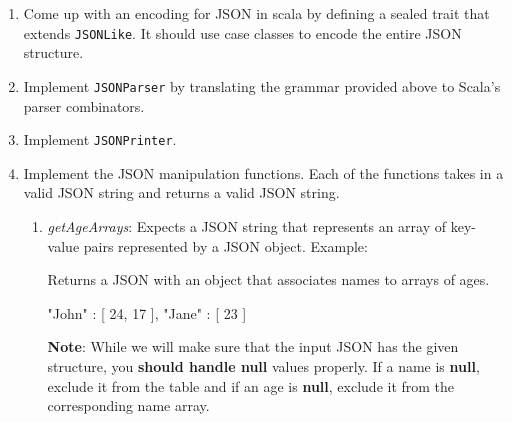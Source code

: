 \begin{enumerate}
    \item Come up with an encoding for JSON in scala by defining a sealed trait
    that extends \lstinline|JSONLike|. It should use case classes to encode
    the entire JSON structure.
    \item Implement \lstinline|JSONParser| by translating the grammar provided
    above to Scala's parser combinators.
    \item Implement \lstinline|JSONPrinter|.

    \item Implement the JSON manipulation functions. Each of the functions
    takes in a valid JSON string and returns a valid JSON string.
    \begin{enumerate}
        \item \textit{getAgeArrays}: Expects a JSON string that represents an
        array of key-value pairs represented by a JSON object. Example:
        \begin{scalacode}
        \end{scalacode}
        Returns a JSON with an object that associates names to arrays of ages.
        \begin{scalacode}
            {
                "John" : [ 24, 17 ],
                "Jane" : [ 23 ]
            }
        \end{scalacode}
        \textbf{Note}: While we will make sure that the input JSON has the given
        structure, you \textbf{should handle null} values properly.
        If a name is \textbf{null}, exclude it from the table and if an age is
        \textbf{null}, exclude it from the corresponding name array.


\end{enumerate}
\end{enumerate}
